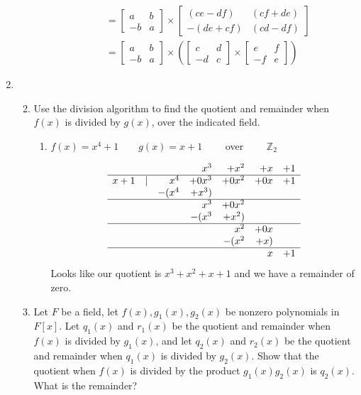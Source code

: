 \documentclass[letterpaper]{article}
\begin{document}
\begin{enumerate}
\begin{enumerate}
\begin{enumerate}
\begin{align*}
        &=\left[\begin{array}{rr}a&b\\-b&a\end{array}\right]
        \times\left[\begin{array}{rr}(ce-df)&(cf+de)\\-(de+cf)&(cd-df)\end{array}\right]\\
        &=\left[\begin{array}{rr}a&b\\-b&a\end{array}\right]
        \times\left(\left[\begin{array}{rr}c&d\\-d&c\end{array}\right]
        \times\left[\begin{array}{rr}e&f\\-f&e\end{array}\right]\right)
      \end{align*}
    \end{enumerate}
    \renewcommand{\labelenumiii}{(\alph{enumiii})}
  \end{enumerate}
\item
  \begin{enumerate}
  \setcounter{enumii}{1}
  \item
    Use the division algorithm to find the quotient and remainder when $f(x)$ is divided by $g(x)$, over the indicated field.
    \begin{enumerate}
    \item
      $f(x)=x^4+1\qquad g(x)=x+1\qquad$ over $\qquad\mathbb{Z}_2$

      \[
      \begin{array}{rrrrrrr}
      &&&x^3&+x^2&+x&+1\\
      \hline
      x+1&|&x^4&+0x^3&+0x^2&+0x&+1\\
      &&-(x^4&+x^3)\\
      \hline
      &&&x^3&+0x^2\\
      &&&-(x^3&+x^2)\\
      \hline
      &&&&x^2&+0x\\
      &&&&-(x^2&+x)\\
      \hline
      &&&&&x&+1
      \end{array}
      \]
      Looks like our quotient is $x^3+x^2+x+1$ and we have a remainder of zero.
    \end{enumerate}
  \setcounter{enumii}{7}
  \item
    Let $F$ be a field, let $f(x),g_1(x),g_2(x)$ be nonzero polynomials in $F[x]$. Let $q_1(x)$ and $r_1(x)$ be the quotient and remainder when $f(x)$ is divided by $g_1(x)$, and let $q_2(x)$ and $r_2(x)$ be the quotient and remainder when $q_1(x)$ is divided by $g_2(x)$. Show that the quotient when $f(x)$ is divided by the product $g_1(x)g_2(x)$ is $q_2(x)$. What is the remainder?


\end{enumerate}
\end{enumerate}
\end{document}
